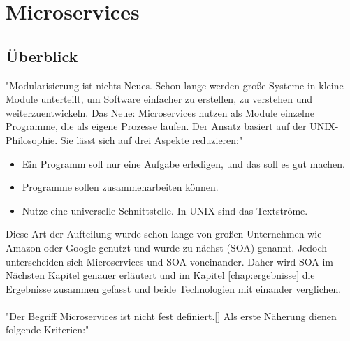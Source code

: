\chapter{Microservices}
\label{chap:Microservices}

\section{Überblick}
\label{sec:überblickMicroservice }
"Modularisierung ist nichts Neues. Schon lange werden große Systeme in kleine Module unterteilt, um Software einfacher zu erstellen, zu verstehen und weiterzuentwickeln. Das Neue: Microservices nutzen als Module einzelne Programme, die als eigene Prozesse laufen. Der Ansatz basiert auf der UNIX-Philosophie. Sie lässt sich auf drei Aspekte reduzieren:"\cite[S. 2]{EWolff2016:Microservices}

\begin{itemize}
    \item Ein Programm soll nur eine Aufgabe erledigen, und das soll es gut machen.
    \item Programme sollen zusammenarbeiten können.
    \item Nutze eine universelle Schnittstelle. In UNIX sind das Textströme.
\end{itemize}
Diese Art der Aufteilung wurde schon lange von großen Unternehmen wie Amazon oder Google genutzt und wurde zu nächst \SOA (SOA) genannt. Jedoch unterscheiden sich Microservices und SOA voneinander. Daher wird SOA im Nächsten Kapitel genauer erläutert und im Kapitel \ref{chap:ergebnisse} die Ergebnisse zusammen gefasst und beide Technologien mit einander verglichen.
\\\\
"Der Begriff Microservices ist nicht fest definiert.[] Als erste Näherung dienen folgende Kriterien:"\cite[S. 2]{EWolff2016:Microservices}

